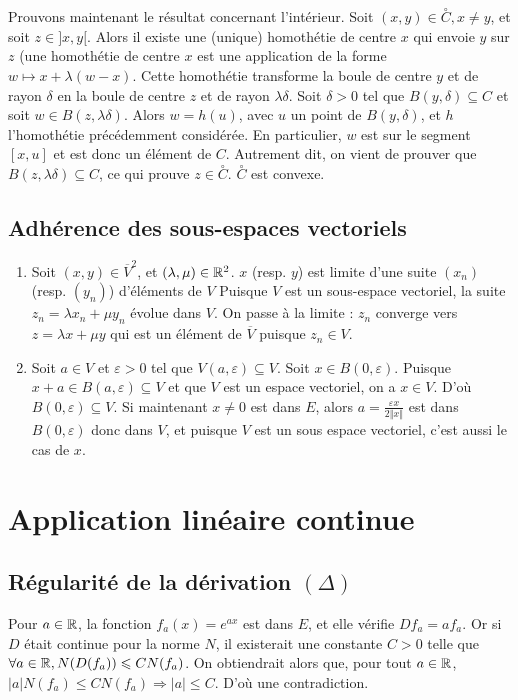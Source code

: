 Prouvons maintenant le résultat concernant l'intérieur. Soit $(x,y)\in \overset{\circ}{C},x\neq y$, et soit $z\in ]x,y[$. Alors il existe une (unique) homothétie de centre $x$ qui envoie $y$ sur $z$ (une homothétie de centre $x$ est une application de la forme $w \mapsto x+\lambda (w - x)$. Cette homothétie transforme la boule de centre $y$ et de rayon $\delta$ en la boule de centre $z$ et de rayon $\lambda \delta$. Soit $\delta >0$ tel que $B(y,\delta) \subseteq C$ et soit $w \in B(z,\lambda \delta)$. Alors $w=h(u)$, avec $u$ un point de $B(y,\delta)$, et $h$ l'homothétie précédemment considérée. En particulier, $w$ est sur le segment $[x,u]$ et est donc un élément de $C$. Autrement dit, on vient de prouver que $B(z,\lambda \delta) \subseteq C$, ce qui prouve $z \in \overset{\circ}{C}$. $\overset{\circ}{C}$ est convexe.

\subsection{Adhérence des sous-espaces vectoriels}
\begin{enumerate}
    \item Soit $(x,y) \in \overline{V}^2$, et $(\lambda,\mu) \in \mathbb{R}^2$. $x$ (resp. $y$) est limite d'une suite $(x_n)$ (resp. $(y_n)$) d'éléments de $V$ Puisque $V$ est un sous-espace vectoriel, la suite $z_n = \lambda x_n + \mu y_n$ évolue dans $V$. On passe à la limite : $z_n$ converge vers $z=\lambda x + \mu y$ qui est un élément de $\overline{V}$ puisque $z_n \in V$.
    \item Soit $a\in V$ et $\varepsilon > 0$ tel que $V(a,\varepsilon) \subseteq V$. Soit $x\in B(0,\varepsilon)$. Puisque $x+a\in B(a,\varepsilon) \subseteq V$ et que $V$ est un espace vectoriel, on a $x \in V$. D'où $B(0,\varepsilon)\subseteq V$. Si maintenant $x\neq 0$ est dans $E$, alors $a=\frac{\varepsilon x }{2 \Vert x \Vert}$ est dans $B(0,\varepsilon)$ donc dans $V$, et puisque $V$ est un sous espace vectoriel, c'est aussi le cas de $x$.
\end{enumerate}

\section{Application linéaire continue}

\subsection{Régularité de la dérivation \texorpdfstring{$(\Delta)$}{Delta}}
Pour $a\in\mathbb{R}$, la fonction $f_a(x)=e^{ax}$ est dans $E$, et elle vérifie $Df_a=af_a$. Or si $D$ était continue pour la norme $N$, il existerait une constante $C>0$ telle que $\forall a\in \mathbb{R}, N(D(f_a)) \leqslant CN(f_a)$. On obtiendrait alors que, pour tout $a\in\mathbb{R}$, $\vert a \vert N(f_a) \leqslant CN(f_a) \Rightarrow \vert a \vert \leqslant C$. D'où une contradiction.

